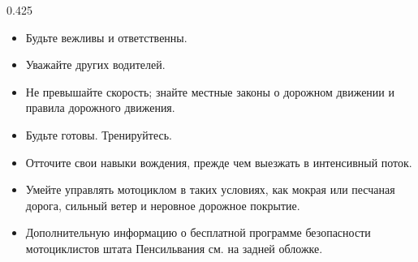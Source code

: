 \begin{langblock}{0.425}
\begin{rus}
\begin{itemize}[nosep]
	\end{itemize}
	\bigskip
	\begin{itemize}[nosep]
		\item Будьте вежливы и ответственны.
		\item Уважайте других водителей.
		\item Не превышайте скорость; знайте местные законы о дорожном движении и правила дорожного движения.
		
	\end{itemize}
	\bigskip
	\begin{itemize}[nosep]
		\item Будьте готовы. Тренируйтесь.
		\item Отточите свои навыки вождения, прежде чем выезжать в интенсивный поток.
		\item Умейте управлять мотоциклом в таких условиях, как мокрая или песчаная дорога, сильный ветер и неровное дорожное покрытие.
		\item Дополнительную информацию о бесплатной программе безопасности мотоциклистов штата Пенсильвания см. на задней обложке.
	\end{itemize}
	

\end{rus}
\end{langblock}